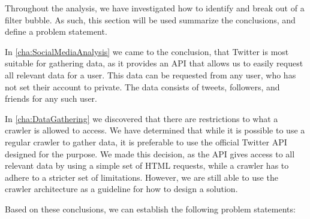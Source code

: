 
Throughout the analysis, we have investigated how to identify and break out of a
filter bubble. As such, this section will be used summarize the conclusions, and
define a problem statement.\nl

In \autoref{cha:SocialMediaAnalysis} we came to the conclusion, that Twitter is
most suitable for gathering data, as it provides an \ac{API} that allows us to
easily request all relevant data for a user. This data can be requested from any
user, who has not set their account to private. The data consists of tweets,
followers, and friends for any such user.\nl

In \autoref{cha:DataGathering} we discovered that there are restrictions to what
a crawler is allowed to access. We have determined that while it is possible to
use a regular crawler to gather data, it is preferable to use the official
Twitter \ac{API} designed for the purpose. We made this decision, as the
\ac{API} gives access to all relevant data by using a simple set of \ac{HTML}
requests, while a crawler has to adhere to a stricter set of limitations.
However, we are still able to use the crawler architecture as a guideline for
how to design a solution.\nl





Based on these conclusions, we can establish the following problem statements:

\begin{center}
\begin{minipage}{0.95\linewidth} 


\end{minipage}
\end{center}




